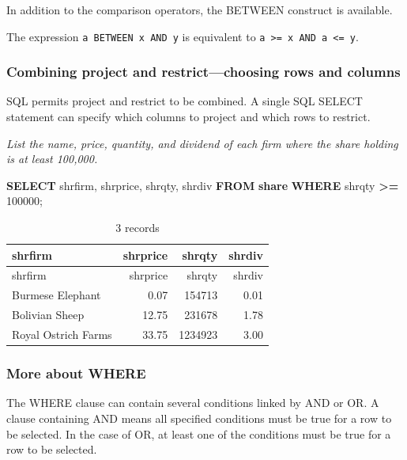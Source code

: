 \documentclass[
]{article}
\newenvironment{Shaded}{\begin{snugshade}}{\end{snugshade}}
\newcommand{\DecValTok}[1]{\textcolor[rgb]{0.00,0.00,0.81}{#1}}
\newcommand{\KeywordTok}[1]{\textcolor[rgb]{0.13,0.29,0.53}{\textbf{#1}}}
\newcommand{\NormalTok}[1]{#1}
\newcommand{\OperatorTok}[1]{\textcolor[rgb]{0.81,0.36,0.00}{\textbf{#1}}}
\begin{document}
In addition to the comparison operators, the BETWEEN construct is
available.

The expression \texttt{a\ BETWEEN\ x\ AND\ y} is equivalent to
\texttt{a\ \textgreater{}=\ x\ AND\ a\ \textless{}=\ y}.

\hypertarget{combining-project-and-restrictchoosing-rows-and-columns}{%
\subsubsection{Combining project and restrict---choosing rows and
columns}\label{combining-project-and-restrictchoosing-rows-and-columns}}

SQL permits project and restrict to be combined. A single SQL SELECT
statement can specify which columns to project and which rows to
restrict.

\emph{List the name, price, quantity, and dividend of each firm where
the share holding is at least 100,000.}

\begin{Shaded}
\begin{Highlighting}[]
\KeywordTok{SELECT}\NormalTok{ shrfirm, shrprice, shrqty, shrdiv }\KeywordTok{FROM} \KeywordTok{share}
  \KeywordTok{WHERE}\NormalTok{ shrqty }\OperatorTok{\textgreater{}=} \DecValTok{100000}\NormalTok{;}
\end{Highlighting}
\end{Shaded}

\begin{longtable}[]{@{}lrrr@{}}
\caption{3 records}\tabularnewline
\toprule()
shrfirm & shrprice & shrqty & shrdiv \\
\midrule()
\endfirsthead
\toprule()
shrfirm & shrprice & shrqty & shrdiv \\
\midrule()
\endhead
Burmese Elephant & 0.07 & 154713 & 0.01 \\
Bolivian Sheep & 12.75 & 231678 & 1.78 \\
Royal Ostrich Farms & 33.75 & 1234923 & 3.00 \\
\bottomrule()
\end{longtable}

\hypertarget{more-about-where}{%
\subsubsection{More about WHERE}\label{more-about-where}}

The WHERE clause can contain several conditions linked by AND or OR. A
clause containing AND means all specified conditions must be true for a
row to be selected. In the case of OR, at least one of the conditions
must be true for a row to be selected.
\end{document}

